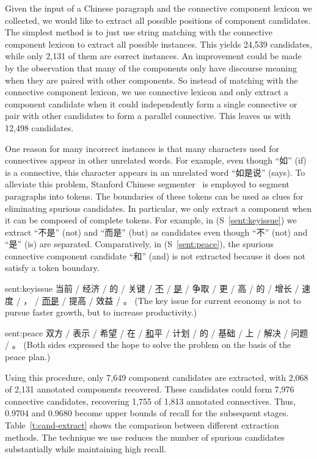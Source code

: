 Given the input of a Chinese paragraph and the connective component lexicon we collected,
we would like to extract all possible positions of component candidates.
The simplest method is to just use string matching with the connective
component lexicon to extract all possible instances. This yields
24,539 candidates, while only 2,131 of them are correct instances. An improvement
could be made by the observation that many of the components only have
discourse meaning when they are paired with other components. So instead of matching
with the connective component lexicon, we use connective lexicon and only extract
a component candidate when it could independently form a single connective or pair
with other candidates to form a parallel connective.
This leaves us with 12,498 candidates.

One reason for many incorrect instances is that many characters used for connectives
appear in other unrelated words. For example, even though ``如'' (if) is a connective,
this character appears in an unrelated word ``如是说'' (says). To alleviate this problem,
Stanford Chinese segmenter~\citep{chang2008optimizing} is employed to segment paragraphs
into tokens. The boundaries of these tokens can be used as clues for eliminating spurious candidates.
In particular, we only extract a component when it can be composed of complete tokens.
For example, in (S~\ref{sent:keyissue}) we extract ``不是'' (not) and ``而是'' (but) as candidates
even though ``不'' (not) and ``是'' (is) are separated. Comparatively, in (S~\ref{sent:peace}),
the spurious connective component candidate ``和'' (and) is not extracted because it does
not satisfy a token boundary.

\begin{sent}{sent:keyissue}{}
    当前 / 经济 / 的 / 关键 / \underline{不} / \underline{是} / 争取 / 更 /
    高 / 的 / 增长 / 速度 / ， / \underline{而是} / 提高 / 效益 / 。
    (The key issue for current economy is not to pursue faster growth, but to
    increase productivity.)
\end{sent}

\begin{sent}{sent:peace}{}
    双方 / 表示 / 希望 / 在 / \underline{和}平 / 计划 / 的 / 基础 / 上 / 解决 / 问题 / 。
    (Both sides expressed the hope to solve the problem on the basis of the peace plan.)
\end{sent}

Using this procedure, only 7,649 component candidates are extracted, with 2,068 of 2,131 annotated
components recovered. These candidates could form 7,976 connective candidates, recovering
1,755 of 1,813 annotated connectives. Thus, 0.9704 and 0.9680 become upper bounds of recall
for the subsequent stages. Table~\ref{t:cand-extract} shows the comparison between different
extraction methods. The technique we use reduces the number of spurious candidates substantially while
maintaining high recall.

